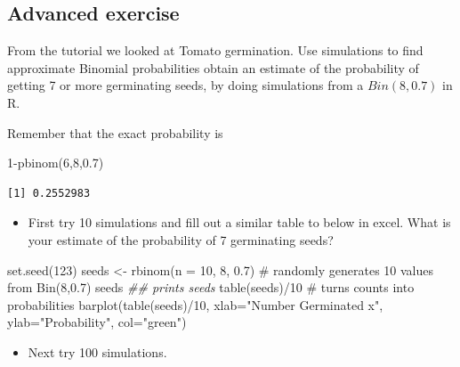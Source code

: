 \documentclass[
  10pt,
  letterpaper,
  DIV=11,
  numbers=noendperiod]{scrartcl}
\newenvironment{Shaded}{\begin{snugshade}}{\end{snugshade}}
\newcommand{\AttributeTok}[1]{\textcolor[rgb]{0.40,0.45,0.13}{#1}}
\newcommand{\CommentTok}[1]{\textcolor[rgb]{0.37,0.37,0.37}{#1}}
\newcommand{\DecValTok}[1]{\textcolor[rgb]{0.68,0.00,0.00}{#1}}
\newcommand{\DocumentationTok}[1]{\textcolor[rgb]{0.37,0.37,0.37}{\textit{#1}}}
\newcommand{\FloatTok}[1]{\textcolor[rgb]{0.68,0.00,0.00}{#1}}
\newcommand{\FunctionTok}[1]{\textcolor[rgb]{0.28,0.35,0.67}{#1}}
\newcommand{\NormalTok}[1]{\textcolor[rgb]{0.00,0.23,0.31}{#1}}
\newcommand{\OtherTok}[1]{\textcolor[rgb]{0.00,0.23,0.31}{#1}}
\newcommand{\SpecialCharTok}[1]{\textcolor[rgb]{0.37,0.37,0.37}{#1}}
\newcommand{\StringTok}[1]{\textcolor[rgb]{0.13,0.47,0.30}{#1}}
\providecommand{\tightlist}{%
  \setlength{\itemsep}{0pt}\setlength{\parskip}{0pt}}\usepackage{longtable,booktabs,array}
\begin{document}
\subsection{Advanced exercise}\label{advanced-exercise}

From the tutorial we looked at Tomato germination. Use simulations to
find approximate Binomial probabilities obtain an estimate of the
probability of getting 7 or more germinating seeds, by doing simulations
from a \(Bin(8, 0.7)\) in R.

Remember that the exact probability is

\begin{Shaded}
\begin{Highlighting}[]
\DecValTok{1}\SpecialCharTok{{-}}\FunctionTok{pbinom}\NormalTok{(}\DecValTok{6}\NormalTok{,}\DecValTok{8}\NormalTok{,}\FloatTok{0.7}\NormalTok{)}
\end{Highlighting}
\end{Shaded}

\begin{verbatim}
[1] 0.2552983
\end{verbatim}

\begin{itemize}
\tightlist
\item
  First try 10 simulations and fill out a similar table to below in
  excel. What is your estimate of the probability of 7 germinating
  seeds?
\end{itemize}

\begin{Shaded}
\begin{Highlighting}[]
\FunctionTok{set.seed}\NormalTok{(}\DecValTok{123}\NormalTok{)}
\NormalTok{seeds }\OtherTok{\textless{}{-}} \FunctionTok{rbinom}\NormalTok{(}\AttributeTok{n =} \DecValTok{10}\NormalTok{, }\DecValTok{8}\NormalTok{, }\FloatTok{0.7}\NormalTok{) }\CommentTok{\# randomly generates 10 values from Bin(8,0.7)}
\NormalTok{seeds }\DocumentationTok{\#\# prints seeds}
\FunctionTok{table}\NormalTok{(seeds)}\SpecialCharTok{/}\DecValTok{10} \CommentTok{\# turns counts into probabilities}
\FunctionTok{barplot}\NormalTok{(}\FunctionTok{table}\NormalTok{(seeds)}\SpecialCharTok{/}\DecValTok{10}\NormalTok{, }\AttributeTok{xlab=}\StringTok{"Number Germinated x"}\NormalTok{, }\AttributeTok{ylab=}\StringTok{"Probability"}\NormalTok{, }\AttributeTok{col=}\StringTok{"green"}\NormalTok{)}
\end{Highlighting}
\end{Shaded}

\begin{itemize}
\tightlist
\item
  Next try 100 simulations.
\end{itemize}
\end{document}
